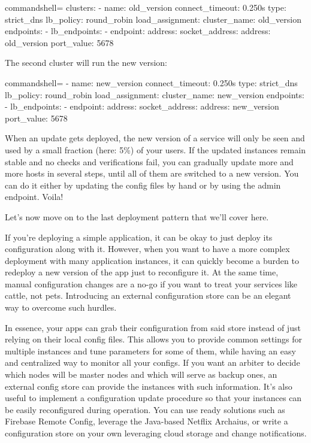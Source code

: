 \begin{tcblisting}{commandshell={}}
clusters:
  - name: old_version
    connect_timeout: 0.250s
    type: strict_dns
    lb_policy: round_robin
    load_assignment:
      cluster_name: old_version
      endpoints:
        - lb_endpoints:
          - endpoint:
            address:
              socket_address:
                address: old_version
                port_value: 5678

\end{tcblisting}

The second cluster will run the new version:

\begin{tcblisting}{commandshell={}}
- name: new_version
  connect_timeout: 0.250s
  type: strict_dns
  lb_policy: round_robin
  load_assignment:
    cluster_name: new_version
    endpoints:
      - lb_endpoints:
        - endpoint:
            address:
              socket_address:
                address: new_version
                port_value: 5678

\end{tcblisting}

When an update gets deployed, the new version of a service will only be seen and used by a small fraction (here: 5\%) of your users. If the updated instances remain stable and no checks and verifications fail, you can gradually update more and more hosts in several steps, until all of them are switched to a new version. You can do it either by updating the config files by hand or by using the admin endpoint. Voila!

Let's now move on to the last deployment pattern that we'll cover here.



If you're deploying a simple application, it can be okay to just deploy its configuration along with it. However, when you want to have a more complex deployment with many application instances, it can quickly become a burden to redeploy a new version of the app just to reconfigure it. At the same time, manual configuration changes are a no-go if you want to treat your services like cattle, not pets. Introducing an external configuration store can be an elegant way to overcome such hurdles.

In essence, your apps can grab their configuration from said store instead of just relying on their local config files. This allows you to provide common settings for multiple instances and tune parameters for some of them, while having an easy and centralized way to monitor all your configs. If you want an arbiter to decide which nodes will be master nodes and which will serve as backup ones, an external config store can provide the instances with such information. It's also useful to implement a configuration update procedure so that your instances can be easily reconfigured during operation. You can use ready solutions such as Firebase Remote Config, leverage the Java-based Netflix Archaius, or write a configuration store on your own leveraging cloud storage and change notifications. 

